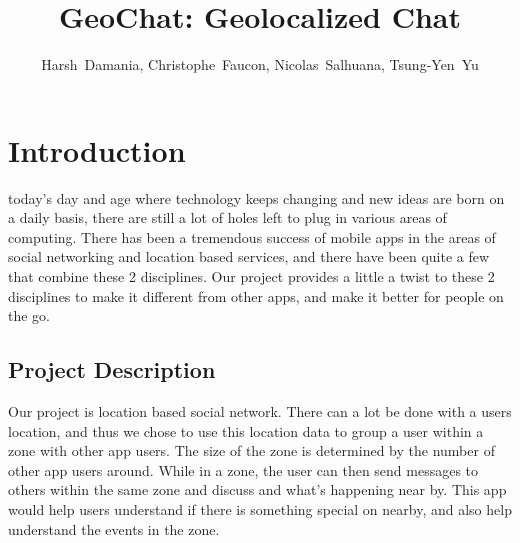 \documentclass[11pt, journal]{IEEEtran}
\begin{document}
\title{GeoChat: Geolocalized Chat}

\author{Harsh~Damania, Christophe~Faucon, Nicolas~Salhuana, Tsung-Yen~Yu}


\maketitle
\IEEEdisplaynotcompsoctitleabstractindextext

\section{Introduction}
	 today's day and age where technology keeps changing and new ideas are born on a daily basis, there are still a lot of holes left to plug in various areas of computing. There has been a tremendous success of mobile apps in the areas of social networking and location based services, and there have been quite a few that combine these 2 disciplines. Our project provides a little a twist to these 2 disciplines to make it different from other apps, and make it better for people on the go.

	\subsection{Project Description}
		Our project is location based social network. There can a lot be done with a users location, and thus we chose to use this location data to group a user within a zone with other app users. The size of the zone is determined by the number of other app users around. While in a zone, the user can then send messages to others within the same zone and discuss and what's happening near by. This app would help users understand if there is something special on nearby, and also help understand the events in the zone.
	
\end{document}

